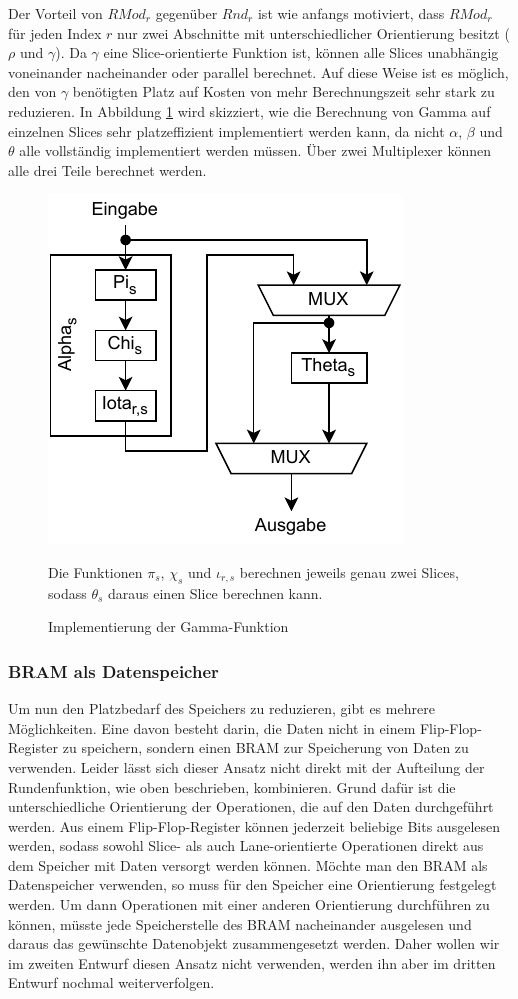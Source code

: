 Der Vorteil von $RMod_r$ gegenüber $Rnd_r$ ist wie anfangs motiviert, dass $RMod_r$ für jeden Index $r$ nur zwei Abschnitte mit unterschiedlicher Orientierung besitzt ($\rho$ und $\gamma$).
Da $\gamma$ eine Slice-orientierte Funktion ist, können alle Slices unabhängig voneinander nacheinander oder parallel berechnet.
Auf diese Weise ist es möglich, den von $\gamma$ benötigten Platz auf Kosten von mehr Berechnungszeit sehr stark zu reduzieren.
In Abbildung \ref{fig:gamma_berechnung} wird skizziert, wie die Berechnung von Gamma auf einzelnen Slices sehr platzeffizient implementiert werden kann, da nicht $\alpha$, $\beta$ und $\theta$
alle vollständig implementiert werden müssen. Über zwei Multiplexer können alle drei Teile berechnet werden.
\begin{figure}
    \center
    \includegraphics{images/gamma_berechnung.pdf}
    \caption{Implementierung der Gamma-Funktion}
    Die Funktionen $\pi_s$, $\chi_s$ und $\iota_{r,s}$ berechnen jeweils genau zwei Slices, sodass $\theta_s$ daraus einen Slice berechnen kann.
    \label{fig:gamma_berechnung}
\end{figure}

\subsubsection{BRAM als Datenspeicher}
Um nun den Platzbedarf des Speichers zu reduzieren, gibt es mehrere Möglichkeiten. Eine davon besteht darin, die Daten nicht in einem Flip-Flop-Register zu speichern,
sondern einen BRAM zur Speicherung von Daten zu verwenden. Leider lässt sich dieser Ansatz nicht direkt mit der Aufteilung der Rundenfunktion, wie oben beschrieben, kombinieren.
Grund dafür ist die unterschiedliche Orientierung der Operationen, die auf den Daten durchgeführt werden.
Aus einem Flip-Flop-Register können jederzeit beliebige Bits ausgelesen werden, sodass sowohl Slice- als auch Lane-orientierte Operationen direkt
aus dem Speicher mit Daten versorgt werden können. Möchte man den BRAM als Datenspeicher verwenden, so muss für den Speicher eine Orientierung festgelegt werden.
Um dann Operationen mit einer anderen Orientierung durchführen zu können, müsste jede Speicherstelle des BRAM nacheinander ausgelesen
und daraus das gewünschte Datenobjekt zusammengesetzt werden.
Daher wollen wir im zweiten Entwurf diesen Ansatz nicht verwenden, werden ihn aber im dritten Entwurf nochmal weiterverfolgen.

